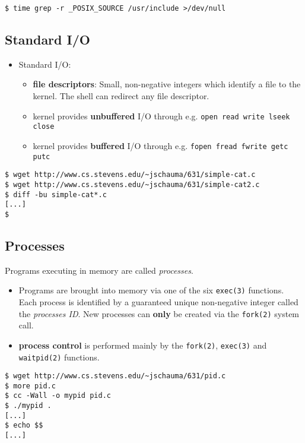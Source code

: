 \documentclass[sxga]{xdvislides}
\begin{document}
\vspace*{\fill}
\begin{verbatim}
$ time grep -r _POSIX_SOURCE /usr/include >/dev/null
\end{verbatim}
\vspace*{\fill}

\subsection{Standard I/O}
\begin{itemize}
	\item	Standard I/O:
		\begin{itemize}
			\item {\bf file descriptors}: Small, non-negative
				integers which identify a file to the kernel.
				The shell can redirect any file descriptor.
			\item kernel provides {\bf unbuffered} I/O through e.g.
				{\tt open read write lseek close}
			\item kernel provides {\bf buffered} I/O through e.g.
				{\tt fopen fread fwrite getc putc}
		\end{itemize}
\end{itemize}
\vspace*{\fill}
\begin{verbatim}
$ wget http://www.cs.stevens.edu/~jschauma/631/simple-cat.c
$ wget http://www.cs.stevens.edu/~jschauma/631/simple-cat2.c
$ diff -bu simple-cat*.c
[...]
$
\end{verbatim}
\vspace*{\fill}


\subsection{Processes}
Programs executing in memory are called {\em processes}.
\begin{itemize}
	\item Programs are brought into memory via one of the
		six {\tt exec(3)} functions.  Each process is identified
		by a guaranteed unique non-negative integer called the
		{\em processes ID}. New processes can {\bf only} be
		created via the {\tt fork(2)} system call.
	\item {\bf process control} is performed mainly by the
		{\tt fork(2)}, {\tt exec(3)} and {\tt waitpid(2)} functions.
\end{itemize}
\vspace*{\fill}
\begin{verbatim}
$ wget http://www.cs.stevens.edu/~jschauma/631/pid.c
$ more pid.c
$ cc -Wall -o mypid pid.c
$ ./mypid .
[...]
$ echo $$
[...]
\end{verbatim}
\vspace*{\fill}
\end{document}
